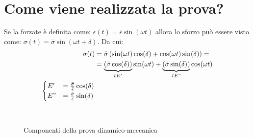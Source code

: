 \section{Come viene realizzata la prova?}
Se la forzate è definita come: $\epsilon(t) = \bar{\epsilon}\sin(\omega t)$ allora lo sforzo può essere visto come: $\sigma(t) = \bar{\sigma}\sin(\omega t + \delta)$. Da cui:
\begin{equation}
\begin{split}
\sigma(t) &= \bar{\sigma}\left(\sin(\omega t)\cos(\delta) + \cos(\omega t)\sin(\delta)\right) =\\
&= \underbrace{(\bar{\sigma}\cos(\delta))}_{\bar{\epsilon}E'}\sin(\omega t) + \underbrace{(\bar{\sigma}\sin(\delta))}_{\bar{\epsilon}E"}\cos(\omega t)\\
\begin{cases}
E' &=\frac{\bar{\sigma}}{\bar{\epsilon}}\cos(\delta)\\
E" &=\frac{\bar{\sigma}}{\bar{\epsilon}}\sin(\delta)
\end{cases}
\end{split}
\end{equation}

\begin{figure}
\centering
{}\quad
{}\\
\caption{Componenti della prova dinamico-meccanica}
\label{fig:ComponentiProva}
\end{figure}

